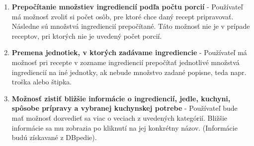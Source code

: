 \begin{enumerate}
\item \textbf{Prepočítanie množstiev ingrediencií podľa počtu porcií} - Používateľ má možnosť zvoliť si počet osôb, pre ktoré chce daný recept pripravovať. Následne sú množstvá ingrediencií prepočítané. Táto možnosť nie je v prípade receptov, pri ktorých nie je uvedený počet porcií.
\item \textbf{Premena jednotiek, v ktorých zadávame ingrediencie} - Používateľ má možnosť pri recepte v zozname ingrediencií prepočítať jednotlivé množstvá ingrediencií na iné jednotky, ak nebude množstvo zadané popisne, teda napr. troška alebo štipka.
\item \textbf{Možnosť zistiť bližšie informácie o ingrediencií, jedle, kuchyni, spôsobe prípravy a vybranej kuchynskej potrebe} - Používateľ bude mať možnosť dozvedieť sa viac o veciach z uvedených kategórií. Bližšie informácie sa mu zobrazia po kliknutí na jej konkrétny názov. (Informácie budú získavané z DBpedie).
\end{enumerate}


